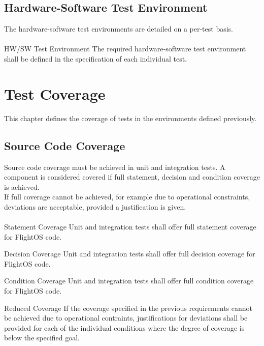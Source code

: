 \section{Hardware-Software Test Environment}

The hardware-software test environments are detailed on a per-test basis.\\
\\

 {HW/SW Test Environment}{%
The required hardware-software test environment shall be defined in the %
specification of each individual test.%
}{}%

\chapter{Test Coverage}

This chapter defines the coverage of tests in the environments defined
previously.


\section{Source Code Coverage}

Source code coverage must be achieved in unit and integration tests.
A component is considered covered if full statement, decision and condition
coverage is achieved. \\

\noindent
If full coverage cannot be achieved, for example due to operational constraints,
deviations are acceptable, provided a justification is given.\\
\\

 {Statement Coverage}{%
Unit and integration tests shall offer full statement coverage for FlightOS code.%
}{}%

 {Decision Coverage}{%
Unit and integration tests shall offer full decision coverage for FlightOS code.%
}{}%

 {Condition Coverage}{%
Unit and integration tests shall offer full condition coverage for FlightOS code.%
}{}%

 {Reduced Coverage}{%
If the coverage specified in the previous requirements cannot be achieved %
due to operational contraints, justifications for deviations shall be provided %
for each of the individual conditions where the degree of coverage is below %
the specified goal. %
}{}%











